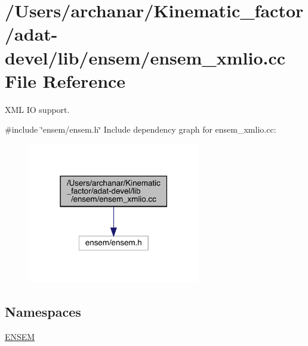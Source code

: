 \hypertarget{adat-devel_2lib_2ensem_2ensem__xmlio_8cc}{}\section{/\+Users/archanar/\+Kinematic\+\_\+factor/adat-\/devel/lib/ensem/ensem\+\_\+xmlio.cc File Reference}
\label{adat-devel_2lib_2ensem_2ensem__xmlio_8cc}


X\+ML IO support.  


{\ttfamily \#include \char`\"{}ensem/ensem.\+h\char`\"{}}\newline
Include dependency graph for ensem\+\_\+xmlio.\+cc\+:
\nopagebreak
\begin{figure}[H]
\begin{center}
\leavevmode
\includegraphics[width=214pt]{da/dd6/adat-devel_2lib_2ensem_2ensem__xmlio_8cc__incl}
\end{center}
\end{figure}
\subsection*{Namespaces}
\begin{DoxyCompactItemize}
\item 
 \mbox{\hyperlink{namespaceENSEM}{E\+N\+S\+EM}}
\end{DoxyCompactItemize}
